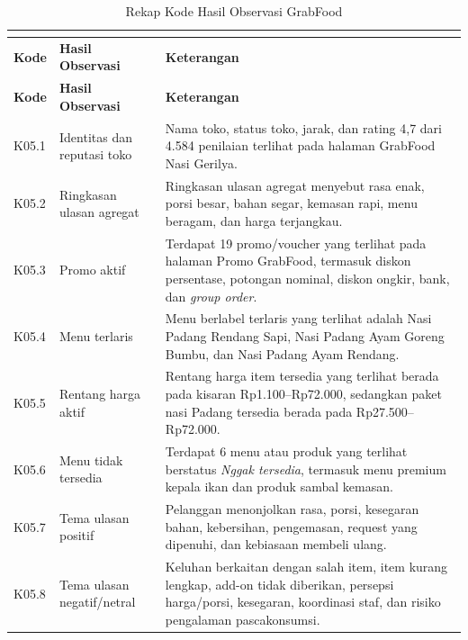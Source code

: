 \begingroup
\scriptsize
\begin{xltabular}{\textwidth}{|Z{1.55cm}|Z{2.75cm}|Y|}
\caption{Rekap Kode Hasil Observasi GrabFood}
\label{tab:temuan-utama-evidence-observasi-grabfood-20260613}
\label{tab:rekap-kode-temuan-observasi-grabfood}
\label{tab:rekap-kode-hasil-observasi-grabfood} \\
        \toprule
        \textbf{Kode} & \textbf{Hasil Observasi} & \textbf{Keterangan} \\ \hline
        \midrule
        \endfirsthead
        \toprule
        \textbf{Kode} & \textbf{Hasil Observasi} & \textbf{Keterangan} \\ \hline
        \midrule
\endhead
{}
\endfoot
        \bottomrule
        \endlastfoot
        K05.1 & Identitas dan reputasi toko & Nama toko, status toko, jarak, dan rating 4,7 dari 4.584 penilaian terlihat pada halaman GrabFood Nasi Gerilya. \\ \hline
        K05.2 & Ringkasan ulasan agregat & Ringkasan ulasan agregat menyebut rasa enak, porsi besar, bahan segar, kemasan rapi, menu beragam, dan harga terjangkau. \\ \hline
        K05.3 & Promo aktif & Terdapat 19 promo/voucher yang terlihat pada halaman Promo GrabFood, termasuk diskon persentase, potongan nominal, diskon ongkir, bank, dan \textit{group order}. \\ \hline
        K05.4 & Menu terlaris & Menu berlabel terlaris yang terlihat adalah Nasi Padang Rendang Sapi, Nasi Padang Ayam Goreng Bumbu, dan Nasi Padang Ayam Rendang. \\ \hline
        K05.5 & Rentang harga aktif & Rentang harga item tersedia yang terlihat berada pada kisaran Rp1.100--Rp72.000, sedangkan paket nasi Padang tersedia berada pada Rp27.500--Rp72.000. \\ \hline
        K05.6 & Menu tidak tersedia & Terdapat 6 menu atau produk yang terlihat berstatus \textit{Nggak tersedia}, termasuk menu premium kepala ikan dan produk sambal kemasan. \\ \hline
        K05.7 & Tema ulasan positif & Pelanggan menonjolkan rasa, porsi, kesegaran bahan, kebersihan, pengemasan, request yang dipenuhi, dan kebiasaan membeli ulang. \\ \hline
        K05.8 & Tema ulasan negatif/netral & Keluhan berkaitan dengan salah item, item kurang lengkap, add-on tidak diberikan, persepsi harga/porsi, kesegaran, koordinasi staf, dan risiko pengalaman pascakonsumsi. \\ \hline
        \bottomrule
\end{xltabular}
\endgroup

